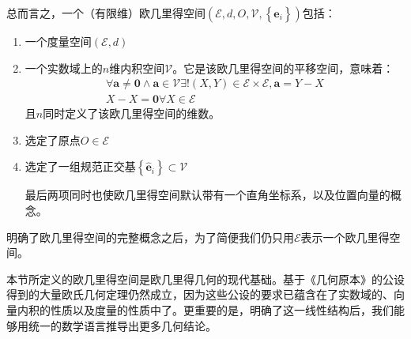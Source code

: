 \documentclass[main.tex]{subfiles}
\begin{document}
总而言之，一个（有限维）欧几里得空间$\left(\mathcal{E},d,O,\mathcal{V},\left\{\mathbf{\hat{e}}_i\right\}\right)$包括：
\begin{enumerate}
    \item 一个度量空间$\left(\mathcal{E},d\right)$
    \item 一个实数域上的$n$维内积空间$\mathcal{V}$。它是该欧几里得空间的平移空间，意味着：
          \begin{align*}
              \forall\mathbf{a}\neq\mathbf{0}\wedge\mathbf{a}\in\mathcal{V}\exists!\left(X,Y\right)\in\mathcal{E}\times\mathcal{E},\mathbf{a}=Y-X \\
              X-X=\mathbf{0}\forall X\in\mathcal{E}
          \end{align*}
          且$n$同时定义了该欧几里得空间的维数。
    \item 选定了原点$O\in\mathcal{E}$
    \item 选定了一组规范正交基$\left\{\mathbf{\hat{e}}_i\right\}\subset\mathcal{V}$

          最后两项同时也使欧几里得空间默认带有一个直角坐标系，以及位置向量的概念。
\end{enumerate}

明确了欧几里得空间的完整概念之后，为了简便我们仍只用$\mathcal{E}$表示一个欧几里得空间。

本节所定义的欧几里得空间是欧几里得几何的现代基础。基于《几何原本》的公设得到的大量欧氏几何定理仍然成立，因为这些公设的要求已蕴含在了实数域的、向量内积的性质以及度量的性质中了\cite{Audin2002}。更重要的是，明确了这一线性结构后，我们能够用统一的数学语言推导出更多几何结论\cite{Berger1987}。
\end{document}
